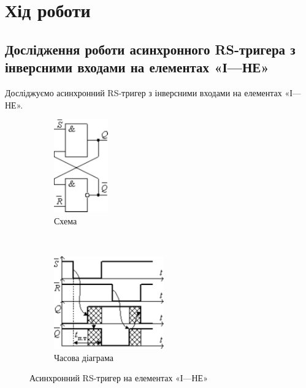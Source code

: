 \documentclass[a4paper,oneside,DIV=10,12pt]{scrartcl}
\begin{document}
	\section{Хід роботи}
		\subsection{Дослідження роботи асинхронного RS-тригера з інверсними входами на елементах «І—НЕ»}
			Досліджуємо асинхронний RS-тригер з інверсними входами на елементах «І—НЕ».
			
			\begin{figure}[!htbp]
			\centering
				\begin{subfigure}[t]{0.45\textwidth}
				\centering
				\vspace{0pt}
					\includegraphics[height=40mm]{assets/03-pdf/flipflop-rs-and-not-schematic.pdf}
				\caption{Схема}
				\label{fig:flipflop-rs-and-not-schematic}
				\end{subfigure}
				~
				\begin{subfigure}[t]{0.45\textwidth}
				\centering
				\vspace{0pt}
					\includegraphics[height=40mm]{assets/03-pdf/flipflop-rs-time-diagram.pdf}
				\caption{Часова діаграма}
				\label{fig:flipflop-rs-time-diagram}
				\end{subfigure}
			\caption{Асинхронний RS-тригер на елементах «І—НЕ»}
			\label{fig:flipflop-rs-and-not}
			\end{figure}
			
			
			
\end{document}
